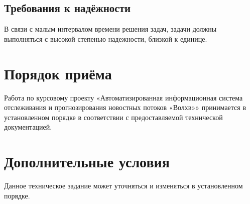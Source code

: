 \documentclass[russian,utf8,emptystyle]{eskdtext}
\makeatletter
\newcounter{pageaux}
\def\currentauxref{PAGEAUX1}
\newcommand{\resetpageaux}{%
  \clearpage
  \edef\@currentlabel{\thepageaux}\label{\currentauxref}%
  \xdef\currentauxref{PAGEAUX\thepage}%
  \setcounter{pageaux}{0}}
\makeatother
\begin{document}
\subsection{Требования к надёжности}
В связи с малым интервалом времени решения задач, задачи должны выполняться с высокой степенью надежности, близкой к единице.

\section{Порядок приёма}

Работа по курсовому проекту «Автоматизированная информационная система отслеживания и прогнозирования новостных потоков «Волхв»» принимается в установленном порядке в соответствии с предоставляемой технической документацией.

\section{Дополнительные условия}

Данное техническое задание может уточняться и изменяться в установленном порядке.

\resetpageaux
\end{document}
